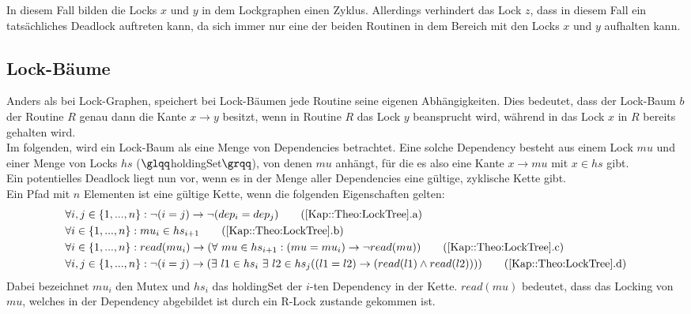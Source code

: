 In diesem Fall bilden die Locks $x$ und $y$ in dem Lockgraphen einen Zyklus. 
Allerdings verhindert das Lock $z$, dass in diesem Fall ein tatsächliches 
Deadlock auftreten kann, da sich immer nur eine der beiden Routinen 
in dem Bereich mit den Locks $x$ und $y$ aufhalten kann.

\subsection{Lock-Bäume} \label{Kap::Theo:LockTree}
Anders als bei Lock-Graphen, speichert bei Lock-Bäumen jede Routine  
seine eigenen Abhängigkeiten. Dies bedeutet, dass der Lock-Baum $b$ der 
Routine $R$ genau dann die Kante $x\to y$ besitzt, wenn in Routine $R$ das 
Lock $y$ beansprucht wird, während in das Lock $x$ in $R$ bereits gehalten wird.\\
Im folgenden, wird ein Lock-Baum als eine Menge von Dependencies betrachtet. 
Eine solche Dependency besteht aus einem Lock $mu$ und einer Menge von Locks $hs$
($\glqq$holdingSet$\grqq$),
von denen $mu$ anhängt, für die es also eine Kante $x \to mu$ mit $x \in hs$ gibt.\\
Ein potentielles Deadlock liegt nun vor, wenn es in der Menge aller Dependencies
eine gültige, zyklische Kette gibt.\\
Ein Pfad mit $n$
Elementen ist eine gültige Kette, wenn die folgenden Eigenschaften gelten:
\begin{align}
  &\forall i, j \in \{1,...,n\}: \lnot (i = j) \rightarrow \lnot (dep_i = dep_j) \tag{\ref{Kap::Theo:LockTree}.a}
  \label{For::Theo:LockTree.a}\\
  &\forall i \in \{1,...,n\}: mu_i \in hs_{i+1} 
  \tag{\ref{Kap::Theo:LockTree}.b}
  \label{For::Theo:LockTree.b}\\
  &\forall i \in \{1,...,n\}: read(mu_i) \rightarrow 
  (\forall\ mu \in hs_{i+1}:(mu = mu_i) \to \lnot read(mu))
  \tag{\ref{Kap::Theo:LockTree}.c}
  \label{For::Theo:LockTree.c}\\
  &\forall i, j \in \{1,...,n\}: \lnot (i = j) \rightarrow 
  (\exists\ l1 \in hs_i\ \exists\ l2 \in hs_j ((l1 = l2) \rightarrow 
  (read(l1) \land read(l2)))) 
  \tag{\ref{Kap::Theo:LockTree}.d}
  \label{For::Theo:LockTree.d}
\end{align}
Dabei bezeichnet $mu_i$ den Mutex und $hs_i$ das holdingSet der $i$-ten 
Dependency in der Kette. $read(mu)$ bedeutet, dass das Locking von $mu$, welches 
in der Dependency abgebildet ist durch ein R-Lock zustande gekommen ist.\\
